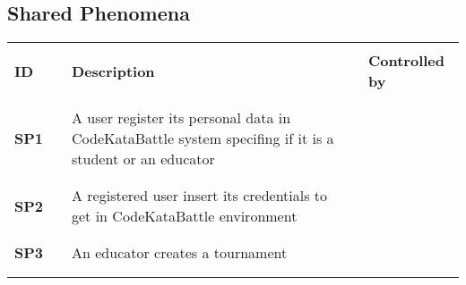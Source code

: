\subsection{Shared Phenomena}

\renewcommand{\arraystretch}{0.5}
\begin{longtable}[H]{l l p{8.5cm} l l}
    \hline
                  &        &                                                                                                                                        &        &                        \\
    \textbf{ID}   & \vline & \textbf{Description}                                                                                                                   & \vline & \textbf{Controlled by} \\
                  &        &                                                                                                                                        &        &                        \\\hline & & & & \\
    \textbf{SP1}  & \vline & A user register its personal data in CodeKataBattle system specifing if it is a student or an educator                                 & \vline &                        \\
                  &        &                                                                                                                                        &        &                        \\\hline & & & & \\
    \textbf{SP2}  & \vline & A registered user insert its credentials to get in CodeKataBattle environment                                                          & \vline &                        \\
                  &        &                                                                                                          &        &                        \\\hline & & & & \\
    \textbf{SP3}  & \vline & An educator creates a tournament                                                                         & \vline &                        \\
                  &        &                                                                                                          &        &                        \\\hline & & & & \\

\end{longtable}
